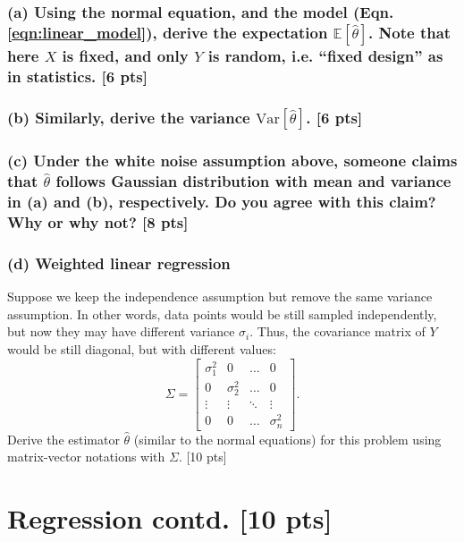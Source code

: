 \documentclass[twoside,10pt]{article}
\begin{document}
\subsubsection*{(a) Using the normal equation, and the model (Eqn. \ref{eqn:linear_model}), derive the expectation
$\mathbb{E}[\hat{\theta}]$. Note that here $X$ is fixed, and only $Y$ is random, i.e. ``fixed design'' as in statistics. [6 pts]}

\subsubsection*{(b) Similarly, derive the variance $\text{Var}[\hat{\theta}]$. [6 pts]}

\subsubsection*{(c) Under the white noise assumption above, someone claims that $\hat{\theta}$ follows Gaussian
distribution with mean and variance in (a) and (b), respectively. Do
you agree with this claim? Why or why not? [8 pts]}

\subsubsection*{(d) Weighted linear regression}

Suppose we keep the independence assumption but
remove the same variance assumption. In other words, data points would be
still sampled independently, but now they may have different
variance $\sigma_i$. Thus, the covariance matrix of $Y$ would be still
diagonal, but with different values:
\begin{equation}
\Sigma = \begin{bmatrix}
\sigma_1^2 & 0 & \dots & 0\\
0 & \sigma_2^2& \dots & 0\\
\vdots & \vdots & \ddots & \vdots\\
0 & 0 & \dots & \sigma_n^2
\end{bmatrix}.
\end{equation}
Derive the estimator $\hat{\theta}$ (similar to the normal equations) for this problem using matrix-vector
notations with $\Sigma$. [10 pts]

\vspace{1cm}


\section{Regression contd. [10 pts]}
\end{document}
